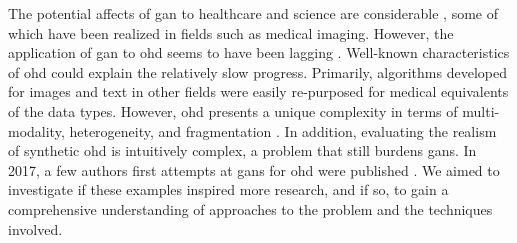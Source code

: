         The potential affects of \gls{gan} to healthcare and science are considerable \cite{Rankin2020}, some of which have been realized in fields such as medical imaging. However, the application of \gls{gan} to \gls{ohd} seems to have been lagging \cite{Xiao_2018_chall}. Well-known characteristics of \gls{ohd} could explain the relatively slow progress. Primarily, algorithms developed for images and text in other fields were easily re-purposed for medical equivalents of the data types. However, \gls{ohd} presents a unique complexity in terms of multi-modality, heterogeneity, and fragmentation \cite{Xiao_2018_chall}. In addition, evaluating the realism of synthetic \gls{ohd} is intuitively complex, a problem that still burdens \glspl{gan}. In 2017, a few authors first attempts at \glspl{gan} for \gls{ohd} were published \cite{esteban2017real,Che_2017,Choi2017-nt,yahi2017generative}. We aimed to investigate if these examples inspired more research, and if so, to gain a comprehensive understanding of approaches to the problem and the techniques involved.
